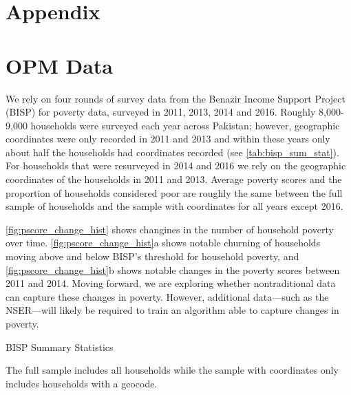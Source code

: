 \documentclass[8pt, oneside]{article}
\begin{document}
\newpage
\appendix
\section*{Appendix}

\section{OPM Data}

We rely on four rounds of survey data from the Benazir Income Support Project (BISP) for poverty data, surveyed in 2011, 2013, 2014 and 2016. Roughly 8,000-9,000 households were surveyed each year across Pakistan; however, geographic coordinates were only recorded in 2011 and 2013 and within these years only about half the households had coordinates recorded (see \autoref{tab:bisp_sum_stat}). For households that were resurveyed in 2014 and 2016 we rely on the geographic coordinates of the households in 2011 and 2013. Average poverty scores and the proportion of households considered poor are roughly the same between the full sample of households and the sample with coordinates for all years except 2016. 
\par
\autoref{fig:pscore_change_hist} shows changines in the number of household poverty over time. \autoref{fig:pscore_change_hist}a shows notable churning of households moving above and below BISP's threshold for household poverty, and \autoref{fig:pscore_change_hist}b shows notable changes in the poverty scores between 2011 and 2014. Moving forward, we are exploring whether nontraditional data can capture these changes in poverty. However, additional data---such as the NSER---will likely be required to train an algorithm able to capture changes in poverty.  

\begin{table}[H]
\caption{BISP Summary Statistics}
\label{tab:bisp_sum_stat}
\centering

\flushleft \footnotesize The full sample includes all households while the sample with coordinates only includes households with a geocode.
\end{table}
\end{document}
